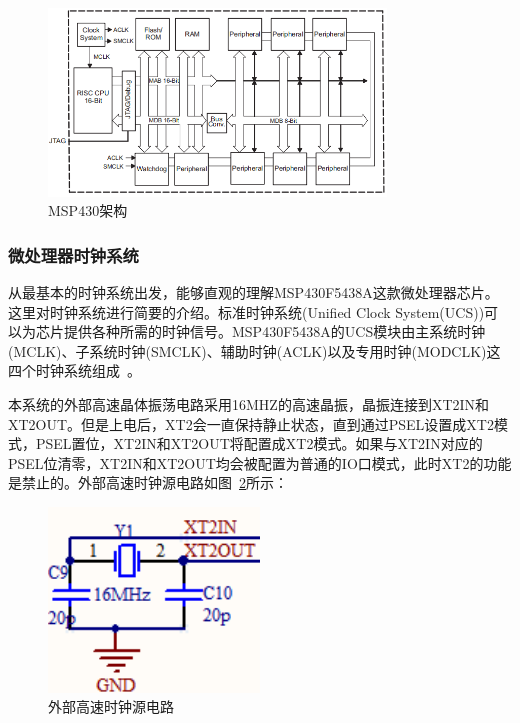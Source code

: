 \begin{figure}[ht]
    \centering
	\includegraphics[width=0.8\textwidth]{fig/MSP430架构.png}
	\caption{MSP430架构}
	\label{fig:MSP430架构}
\end{figure}

\subsubsection{微处理器时钟系统} 
从最基本的时钟系统出发，能够直观的理解MSP430F5438A这款微处理器芯片。这里对时钟系统进行简要的介绍。标准时钟系统(Unified Clock System(UCS))可以为芯片提供各种所需的时钟信号。MSP430F5438A的UCS模块由主系统时钟(MCLK)、子系统时钟(SMCLK)、辅助时钟(ACLK)以及专用时钟(MODCLK)这四个时钟系统组成~\cite{sxf}。

本系统的外部高速晶体振荡电路采用16MHZ的高速晶振，晶振连接到XT2IN和XT2OUT。但是上电后，XT2会一直保持静止状态，直到通过PSEL设置成XT2模式，PSEL置位，XT2IN和XT2OUT将配置成XT2模式。如果与XT2IN对应的PSEL位清零，XT2IN和XT2OUT均会被配置为普通的IO口模式，此时XT2的功能是禁止的。外部高速时钟源电路如图~\ref{fig:外部时钟源电路}所示：

\begin{figure}[ht]
    \centering
	\includegraphics[width=0.5\textwidth]{fig/外部时钟源电路.png}
	\caption{外部高速时钟源电路}
	\label{fig:外部时钟源电路}
\end{figure} 

